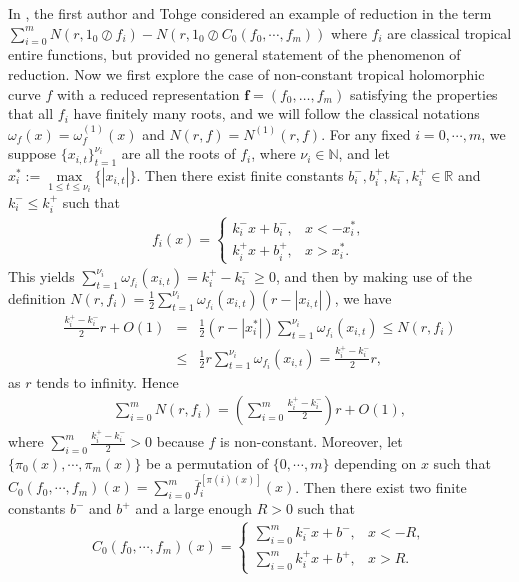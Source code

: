 \documentclass{article}
\begin{document}
In \cite{Pro}, the first author and Tohge considered an example of reduction in the term $\sum_{i=0}^{m}N(r, 1_{0}\oslash f_{i})-N(r, 1_{0}\oslash C_{0}(f_{0}, \cdots, f_{m}))$ where $f_{i}$ are classical tropical entire functions, but provided no general statement of the phenomenon of reduction. Now we first explore the case of non-constant tropical holomorphic curve $f$ with a reduced representation $\textbf{f}=(f_{0}, \dots, f_{m})$ satisfying the properties that all $f_{i}$ have finitely many roots, and we will follow the classical notations $\omega_{f}(x)=\omega_{f}^{(1)}(x)$ and $N(r, f)=N^{(1)}(r, f)$. For any fixed $i=0, \cdots, m$, we suppose $\{x_{i, t}\}_{t=1}^{\nu_{i}}$ are all the roots of $f_{i}$, where $\nu_{i}\in\mathbb{N}$, and let $x_{i}^{*}:=\max\limits_{1\leq t\leq \nu_{i}}\{|x_{i, t}|\}$. Then there exist finite constants $b_{i}^{-}, b_{i}^{+}, k_{i}^{-}, k_{i}^{+}\in\mathbb{R}$ and $k_{i}^{-}\leq k_{i}^{+}$ such that
\begin{eqnarray*}
         f_{i}(x)=\left\{\begin{array}{ll}
         k_{i}^{-}x+b_{i}^{-}, & x< -x_{i}^{*},\\
         k_{i}^{+}x+b_{i}^{+}, & x> x_{i}^{*}.
         \end{array}\right.
    \end{eqnarray*}
This yields $\sum_{t=1}^{\nu_{i}}\omega_{f_{i}}(x_{i, t})=k_{i}^{+}-k_{i}^{-}\geq 0$, and then by making use of the definition $N(r, f_{i})=\frac{1}{2}\sum_{t=1}^{\nu_{i}}\omega_{f_{i}}(x_{i, t})(r-|x_{i, t}|)$, we have
\begin{eqnarray*}
    \frac{k_{i}^{+}-k_{i}^{-}}{2}r+O(1)&=&\frac{1}{2}(r-|x_{i}^{*}|)\sum_{t=1}^{\nu_{i}}\omega_{f_{i}}(x_{i, t})\leq N(r, f_{i})\\
    &\leq& \frac{1}{2}r\sum_{t=1}^{\nu_{i}}\omega_{f_{i}}(x_{i, t})=\frac{k_{i}^{+}-k_{i}^{-}}{2}r,
\end{eqnarray*}
as $r$ tends to infinity. Hence
\begin{eqnarray}\label{6a111}
    \sum_{i=0}^{m}N(r, f_{i})=\left(\sum_{i=0}^{m}\frac{k_{i}^{+}-k_{i}^{-}}{2}\right)r+O(1),
\end{eqnarray}
where $\sum_{i=0}^{m}\frac{k_{i}^{+}-k_{i}^{-}}{2}>0$ because $f$ is non-constant. Moreover, let $\{\pi_{0}(x), \cdots, \pi_{m}(x)\}$ be a permutation of $\{0, \cdots, m\}$ depending on $x$ such that $C_{0}(f_{0}, \cdots, f_{m})(x)=\sum_{i=0}^{m}\overline{f}_{i}^{[\pi(i)(x)]}(x)$. Then there exist two finite constants $b^{-}$ and $b^{+}$ and a large enough $R>0$ such that  
\begin{eqnarray*}
         C_{0}(f_{0}, \cdots, f_{m})(x)=\left\{\begin{array}{ll}
         \sum_{i=0}^{m}k_{i}^{-}x+b^{-}, & x< -R,\\
         \sum_{i=0}^{m}k_{i}^{+}x+b^{+}, & x> R.
         \end{array}\right.
    \end{eqnarray*}
\end{document}
